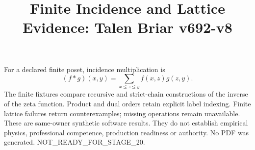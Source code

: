 \documentclass{article}
\title{Finite Incidence and Lattice Evidence: Talen Briar v692-v8}
\begin{document}
\maketitle
For a declared finite poset, incidence multiplication is
\[ (f*g)(x,y)=\sum_{x\leq z\leq y}f(x,z)g(z,y). \]
The finite fixtures compare recursive and strict-chain constructions of the inverse of the zeta function. Product and dual orders retain explicit label indexing. Finite lattice failures return counterexamples; missing operations remain unavailable.
These are same-owner synthetic software results. They do not establish empirical physics, professional competence, production readiness or authority. No PDF was generated. NOT\_READY\_FOR\_STAGE\_20.
\end{document}
